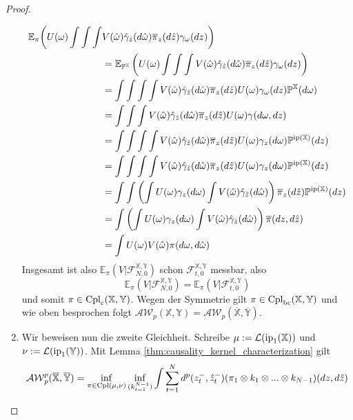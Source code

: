 \begin{proof}
\begin{enumerate}
\begin{align*}
    \mathbb{E}_{\pi}\biggl(U(\omega) \int\int\int &V(\hat{\omega}) \hat{\gamma}_{\hat{z}}(d\hat{\omega}) \overline{\pi}_z(d\hat{z})\gamma_\omega(dz) \biggr) \\
    &= \mathbb{E}_{\mathbb{P}^{\mathbb{X}}}\left(U(\omega) \int\int\int V(\hat{\omega}) \hat{\gamma}_{\hat{z}}(d\hat{\omega}) \overline{\pi}_z(d\hat{z})\gamma_\omega(dz) \right) \\
    &= \int\int\int\int V(\hat{\omega}) \hat{\gamma}_{\hat{z}}(d\hat{\omega}) \overline{\pi}_z(d\hat{z})U(\omega)\gamma_\omega(dz) \mathbb{P}^{\mathbb{X}}(d\omega) \\
    &= \int\int\int V(\hat{\omega}) \hat{\gamma}_{\hat{z}}(d\hat{\omega}) \overline{\pi}_z(d\hat{z})U(\omega)\gamma(d\omega, dz) \\
    &= \int\int\int\int V(\hat{\omega}) \hat{\gamma}_{\hat{z}}(d\hat{\omega}) \overline{\pi}_z(d\hat{z})U(\omega)\gamma_z(d\omega)\mathbb{P}^{\operatorname{ip}(\mathbb{X})}(dz)\\
    &= \int\int\int\int V(\hat{\omega}) \hat{\gamma}_{\hat{z}}(d\hat{\omega}) \overline{\pi}_z(d\hat{z})U(\omega)\gamma_z(d\omega)\mathbb{P}^{\operatorname{ip}(\mathbb{X})}(dz) \\
    &= \int\int\left(\int U(\omega)\gamma_z(d\omega) \int V(\hat{\omega}) \hat{\gamma}_{\hat{z}}(d\hat{\omega}) \right)\overline{\pi}_z(d\hat{z})\mathbb{P}^{\operatorname{ip}(\mathbb{X})}(dz) \\
    &= \int\left(\int U(\omega)\gamma_z(d\omega) \int V(\hat{\omega}) \hat{\gamma}_{\hat{z}}(d\hat{\omega}) \right)\overline{\pi}(dz, d\hat{z}) \\
    &= \int U(\omega)V(\hat{\omega})\pi(d\omega, d\hat{\omega})
\end{align*}
Insgesamt ist also $\mathbb{E}_\pi(V\vert \mathcal{F}_{N,0}^{\mathbb{X}, \mathbb{Y}})$ schon $\mathcal{F}_{t,0}^{\mathbb{X}, \mathbb{Y}}$ messbar, also
$$\mathbb{E}_\pi(V \vert \mathcal{F}_{N,0}^{\mathbb{X}, \mathbb{Y}}) = \mathbb{E}_\pi(V \vert \mathcal{F}_{t,0}^{\mathbb{X}, \mathbb{Y}})$$
und somit $\pi\in \operatorname{Cpl}_{\operatorname{c}}(\mathbb{X}, \mathbb{Y})$. Wegen der Symmetrie gilt $\pi \in \operatorname{Cpl}_{\operatorname{bc}}(\mathbb{X}, \mathbb{Y})$ und wie oben besprochen folgt $\mathcal{AW}_p(\mathbb{X}, \mathbb{Y}) = \mathcal{AW}_p(\overline{\mathbb{X}}, \overline{\mathbb{Y}})$.
\item
Wir beweisen nun die zweite Gleichheit. Schreibe $\mu := \mathcal{L}(\operatorname{ip}_1(\mathbb{X}))$ und $\nu := \mathcal{L}(\operatorname{ip}_1(\mathbb{Y}))$. Mit Lemma \ref{thm:causality_kernel_characterization} gilt
$$\mathcal{AW}_p^p(\overline{\mathbb{X}}, \overline{\mathbb{Y}}) = \inf_{\pi \in \operatorname{Cpl}(\mu, \nu)} \inf_{(k_{t=1}^{N-1})} \int \sum_{t=1}^{N}d^p(z_t^-, \hat{z}_t^-) (\pi_1 \otimes k_1 \otimes ... \otimes k_{N-1})(dz, d\hat{z})$$

\end{enumerate}
\end{proof}
